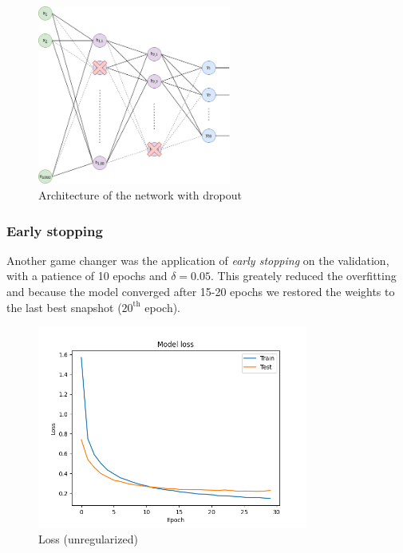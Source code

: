 \documentclass[compsoc]{IEEEtran}
\begin{document}
\begin{figure}[ht!]
\centering                                                                        
\includegraphics[width=2.5in]{regffnn.png}
\captionsetup{justification=centering}                                                                                                           
\caption{Architecture of the network with dropout}
\label{fig:regffnn}
\end{figure}

\subsubsection{Early stopping}
Another game changer was the application of \emph{early stopping} on the validation, with a patience of 10 epochs and $\delta = 0.05$. This greately reduced the overfitting and because the model converged after 15-20 epochs we restored the weights to the last best snapshot ($20^{\text{th}}$ epoch).








\begin{figure}[ht!]
\centering                                                                        
\includegraphics[width=3.5in]{../images/reg/loss-LeakyReLU-NoneType-categorical_crossentropy-Adam-50-256-0.1.png}
\captionsetup{justification=centering}                                                                                                                              
\caption{Loss (unregularized)}
\label{fig:loss2}                                                                                                                                                           
\end{figure}
\end{document}
